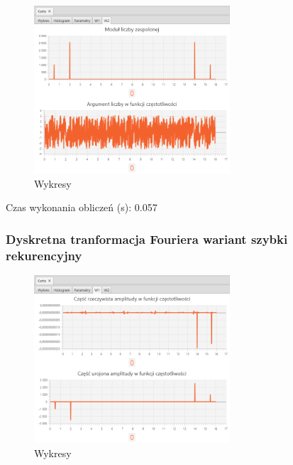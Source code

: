\documentclass[12pt]{article}
\begin{document}
{{{                \begin{figure}[H]
                    \centering
                    \includegraphics[width=0.65\textwidth]{img/result/s1/02/W2_draw_2_sinus_sampling_trans_s1_data_205624.png}
                    \caption{Wykresy}
                \end{figure}

                Czas wykonania obliczeń (s): 0.057
            }
            \newpage

            \subsubsection{Dyskretna tranformacja Fouriera wariant szybki rekurencyjny} {

                \begin{figure}[H]
                    \centering
                    \includegraphics[width=0.65\textwidth]{img/result/s1/03/W1_draw_3_sinus_sampling_trans_s1_data_205632.png}
                    \caption{Wykresy}
                \end{figure}

}}}
\end{document}
